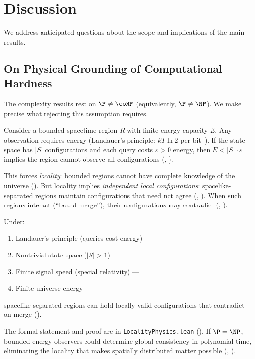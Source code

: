 \section{Discussion}\label{sec:discussion}

We address anticipated questions about the scope and implications of the main results.

\subsection{On Physical Grounding of Computational Hardness}\label{sec:locality-physics}

The complexity results rest on $\P \neq \coNP$ (equivalently, $\P \neq \NP$). We make precise what rejecting this assumption requires.

Consider a bounded spacetime region $R$ with finite energy capacity $E$. Any observation requires energy (Landauer's principle: $kT\ln 2$ per bit~\cite{landauer1961irreversibility}). If the state space has $|S|$ configurations and each query costs $\varepsilon > 0$ energy, then $E < |S| \cdot \varepsilon$ implies the region cannot observe all configurations (, ).

This forces \emph{locality}: bounded regions cannot have complete knowledge of the universe (). But locality implies \emph{independent local configurations}: spacelike-separated regions maintain configurations that need not agree (, ). When such regions interact (``board merge''), their configurations may contradict (, ).

\begin{theorem}\label{thm:pne-np-physics}
Under:
\begin{enumerate}
\item Landauer's principle (queries cost energy) --- 
\item Nontrivial state space ($|S| > 1$) --- 
\item Finite signal speed (special relativity) --- 
\item Finite universe energy --- 
\end{enumerate}
spacelike-separated regions can hold locally valid configurations that contradict on merge ().
\end{theorem}

The formal statement and proof are in \texttt{LocalityPhysics.lean} (). If $\P = \NP$, bounded-energy observers could determine global consistency in polynomial time, eliminating the locality that makes spatially distributed matter possible (, ).

